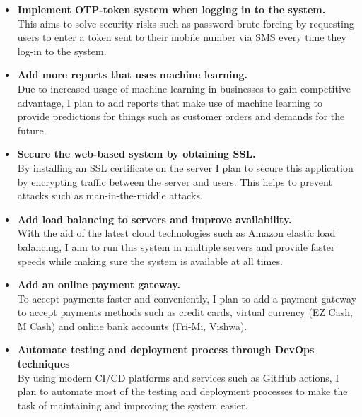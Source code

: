 \documentclass[12pt]{report}
\begin{document}
\begin{itemize}
	\item {\bf{Implement OTP-token system when logging in to the system.}} \\
	      This aims to solve security risks such as password brute-forcing by requesting users to enter a token sent to their mobile number via SMS every time they log-in to the system.

	\item {\bf{Add more reports that uses machine learning.}} \\
	      Due to increased usage of machine learning in businesses to gain competitive advantage, I plan to add reports that make use of machine learning to provide predictions for things such as customer orders and demands for the future.

	\item {\bf{Secure the web-based system by obtaining SSL.}} \\
	      By installing an SSL certificate on the server I plan to secure this application by encrypting traffic between the server and users. This helps to prevent attacks such as man-in-the-middle attacks.

	\item {\bf{Add load balancing to servers and improve availability.}} \\
	      With the aid of the latest cloud technologies such as Amazon elastic load balancing, I aim to run this system in multiple servers and provide faster speeds while making sure the system is available at all times.

	\item {\bf{Add an online payment gateway.}} \\
	      To accept payments faster and conveniently, I plan to add a payment gateway to accept payments methods such as credit cards, virtual currency (EZ Cash, M Cash) and online bank accounts (Fri-Mi, Vishwa).

	\item {\bf{Automate testing and deployment process through DevOps techniques}} \\
	      By using modern CI/CD platforms and services such as GitHub actions, I plan to automate most of the testing and deployment processes to make the task of maintaining and improving the system easier.
\end{itemize}



\newpage
{}
\singlespacing
\printbibliography[title={References}]
\end{document}
